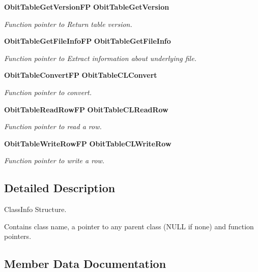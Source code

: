 \begin{CompactItemize}
{\bf Obit\-Table\-Get\-Version\-FP} {\bf Obit\-Table\-Get\-Version}
\begin{CompactList}\small\item\em Function pointer to Return table version. \item\end{CompactList}\item 
{\bf Obit\-Table\-Get\-File\-Info\-FP} {\bf Obit\-Table\-Get\-File\-Info}
\begin{CompactList}\small\item\em Function pointer to Extract information about underlying file. \item\end{CompactList}\item 
{\bf Obit\-Table\-Convert\-FP} {\bf Obit\-Table\-CLConvert}
\begin{CompactList}\small\item\em Function pointer to convert. \item\end{CompactList}\item 
{\bf Obit\-Table\-Read\-Row\-FP} {\bf Obit\-Table\-CLRead\-Row}
\begin{CompactList}\small\item\em Function pointer to read a row. \item\end{CompactList}\item 
{\bf Obit\-Table\-Write\-Row\-FP} {\bf Obit\-Table\-CLWrite\-Row}
\begin{CompactList}\small\item\em Function pointer to write a row. \item\end{CompactList}\end{CompactItemize}


\subsection{Detailed Description}
Class\-Info Structure. 

Contains class name, a pointer to any parent class (NULL if none) and function pointers. 



\subsection{Member Data Documentation}
